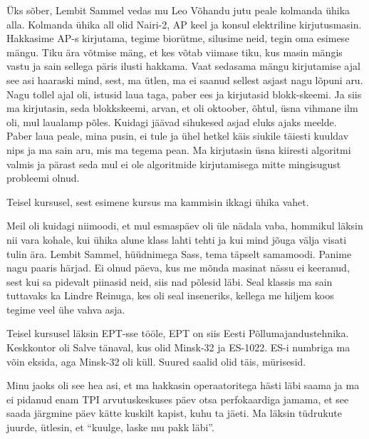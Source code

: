 Üks sõber, Lembit Sammel vedas mu Leo 
Võhandu jutu peale kolmanda ühika alla. Kolmanda ühika 
all olid Nairi-2, AP keel ja 
konsul elektriline kirjutusmasin. Hakkasime AP-s kirjutama, tegime biorütme, 
silusime neid, tegin oma esimese mängu. Tiku ära võtmise mäng, et kes võtab 
viimase tiku, kus masin mängis vastu ja sain sellega päris ilusti hakkama. Vaat 
sedasama mängu kirjutamise ajal see asi haaraski mind, sest, ma ütlen,  ma ei 
saanud sellest asjast nagu lõpuni aru.  Nagu tollel ajal oli, istusid laua 
taga, paber ees ja kirjutasid blokk-skeemi. Ja siis ma kirjutasin, seda 
blokkskeemi, arvan, et oli oktoober, õhtul, üsna vihmane ilm oli, mul laualamp 
põles.  Kuidagi jäävad sihukesed asjad eluks ajaks meelde. Paber laua peale, 
mina pusin, ei tule ja ühel hetkel käis siukile täiesti kuuldav nips ja ma sain 
aru, mis ma tegema pean. Ma kirjutasin üsna kiiresti  algoritmi valmis ja 
pärast seda mul ei ole algoritmide kirjutamisega mitte mingisugust probleemi 
olnud. 

Teisel kursusel, sest esimene kursus ma kammisin ikkagi ühika vahet. 

Meil oli kuidagi niimoodi, et mul esmaspäev oli üle nädala vaba, hommikul 
läksin nii vara kohale, kui ühika alune klass lahti tehti ja kui mind jõuga 
välja visati tulin ära. Lembit Sammel, hüüdnimega Sass, tema täpselt samamoodi. 
Panime nagu paaris härjad. Ei olnud päeva, kus me mõnda masinat nässu ei 
keeranud, sest kui sa pidevalt piinasid neid, siis nad põlesid läbi. Seal 
klassis ma sain tuttavaks ka Lindre Reinuga, kes oli 
seal inseneriks,  kellega me hiljem koos tegime veel ühe vahva asja. 

Teisel kursusel läksin EPT-sse tööle, EPT on siis Eesti 
Põllumajandustehnika. Keskkontor oli Salve 
tänaval, kus olid Minsk-32 ja 
ES-1022. ES-i numbriga ma võin eksida, aga 
Minsk-32 oli küll. Suured saalid olid täis, mürisesid. 

Minu jaoks oli see hea asi, et ma hakkasin operaatoritega hästi läbi saama ja 
ma ei pidanud enam TPI arvutuskeskuses päev otsa perfokaardiga jamama, et see 
saada järgmine päev kätte kuskilt kapist, kuhu ta jäeti. Ma läksin tüdrukute 
juurde, ütlesin, et \enquote{kuulge,  laske mu pakk läbi}. 

